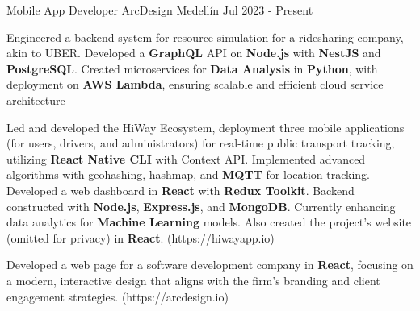 
\begin{cventries}
  \cventry
  {Mobile App Developer} %
  {ArcDesign} %
  {Medellín} %
  {Jul 2023 - Present} %
  {
    \begin{cvitems} %
      \item {Engineered a backend system for resource simulation for a ridesharing company, akin to UBER. Developed a \textbf{GraphQL} API on \textbf{Node.js}
      with \textbf{NestJS} and \textbf{PostgreSQL}. Created microservices for \textbf{Data Analysis}
      in \textbf{Python}, with deployment on \textbf{AWS Lambda}, ensuring scalable and
      efficient cloud service architecture}
      \item {Led and developed the HiWay Ecosystem, deployment three mobile
      applications (for users, drivers, and administrators) for real-time
      public transport tracking, utilizing \textbf{React Native CLI} with Context API.
      Implemented advanced algorithms with geohashing, hashmap, and
      \textbf{MQTT} for location tracking. Developed a web dashboard in \textbf{React} with
      \textbf{Redux Toolkit}. Backend constructed with \textbf{Node.js}, \textbf{Express.js}, and
      \textbf{MongoDB}. Currently enhancing data analytics for \textbf{Machine Learning}
      models. Also created the project's website (omitted for privacy) in
      \textbf{React}. (https://hiwayapp.io)}
      \item {Developed a web page for a software development company in
      \textbf{React}, focusing on a modern, interactive design that aligns with the
      firm's branding and client engagement strategies.
      (https://arcdesign.io)}
    \end{cvitems}
  }
\end{cventries}